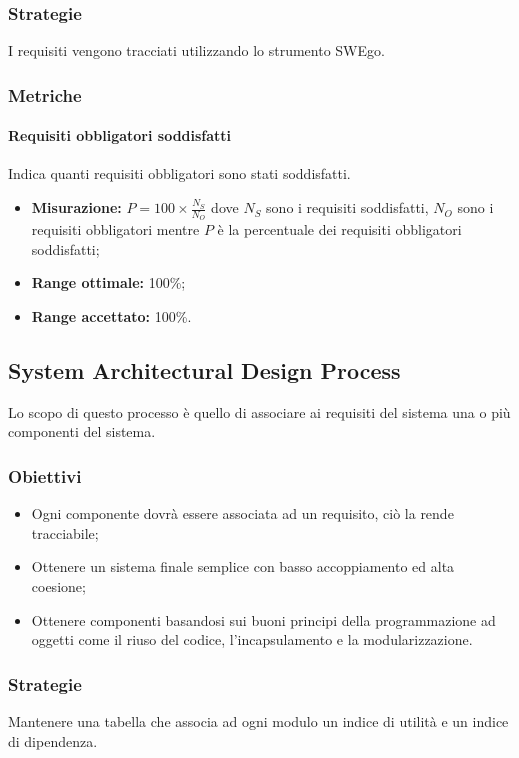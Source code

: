 \subsubsection{Strategie}
I requisiti vengono tracciati utilizzando lo strumento SWEgo.
\subsubsection{Metriche}
\paragraph{Requisiti obbligatori soddisfatti} \Spazio
Indica quanti requisiti obbligatori sono stati soddisfatti.
\begin{itemize}
	 \item \textbf{Misurazione:} $P=100\times\frac{N_S}{N_O}$ dove $N_S$ sono i requisiti soddisfatti, $N_O$ sono i requisiti obbligatori mentre $P$ è la percentuale dei requisiti obbligatori soddisfatti;
	\item \textbf{Range ottimale:} 100\%;
	\item \textbf{Range accettato:} 100\%.
\end{itemize}

\subsection{System Architectural Design Process}
Lo scopo di questo processo è quello di associare ai requisiti del sistema una o più componenti del sistema.
		\subsubsection{Obiettivi}
		\begin{itemize}
			\item Ogni componente dovrà essere associata ad un requisito, ciò la rende tracciabile;
			\item Ottenere un sistema finale semplice con basso accoppiamento ed alta coesione;
			\item Ottenere componenti basandosi sui buoni principi della programmazione ad oggetti come il riuso del codice, l'incapsulamento e la modularizzazione.
		\end{itemize}
		\subsubsection{Strategie}
		Mantenere una tabella che associa ad ogni modulo un indice di utilità e un indice di dipendenza.
